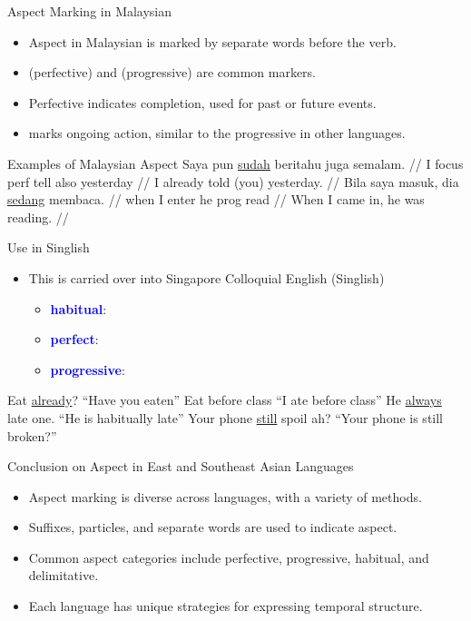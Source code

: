 \documentclass{beamer}
\newcommand{\msa}{\mtciteform}
\newcommand{\txx}[1]{\textcolor{blue}{\textbf{#1}}}
\newcommand{\ul}[1]{\uline{#1}}
\begin{document}
\begin{frame}{Aspect Marking in Malaysian}
\begin{itemize}
    \item Aspect in Malaysian is marked by separate words before the verb.
    \item \msa{Sudah}  (perfective) and \msa{sedang} (progressive) are common markers.
    \item Perfective \msa{sudah} indicates completion, used for past or future events.
    \item \msa{Sedang} marks ongoing action, similar to the progressive in other languages.
\end{itemize}
\end{frame}

\begin{frame}{Examples of Malaysian Aspect}
\ex
\begingl
\gla Saya pun \ul{sudah} beritahu juga semalam. //
\glb I focus perf tell also yesterday //
\glft I already told (you) yesterday. //
\endgl
\xe
\ex
\begingl
\gla Bila saya masuk, dia \ul{sedang} membaca. //
\glb when I enter he prog read //
\glft When I came in, he was reading. //
\endgl
\xe
\end{frame}

\begin{frame}{Use in Singlish}
  \begin{itemize}
  \item This is carried over into Singapore Colloquial English (Singlish)
    \begin{itemize}
    \item \txx{habitual}: 
    \item \txx{perfect}: 
    \item \txx{progressive}: 
    \end{itemize}
  \end{itemize}
  \ex   Eat \ul{already}?  ``Have you eaten''
  \xe
  \ex  Eat before class ``I ate before class''
  \xe
  \ex  He \ul{always} late one. ``He is habitually late''
  \xe
   \ex  Your phone \ul{still} spoil ah? ``Your phone is still broken?'' 
   \xe
\end{frame}


\begin{frame}{Conclusion on Aspect in East and Southeast Asian Languages}
\begin{itemize}
    \item Aspect marking is diverse across languages, with a variety of methods.
    \item Suffixes, particles, and separate words are used to indicate aspect.
    \item Common aspect categories include perfective, progressive, habitual, and delimitative.
    \item Each language has unique strategies for expressing temporal structure.
\end{itemize}
\end{frame}
\end{document}
